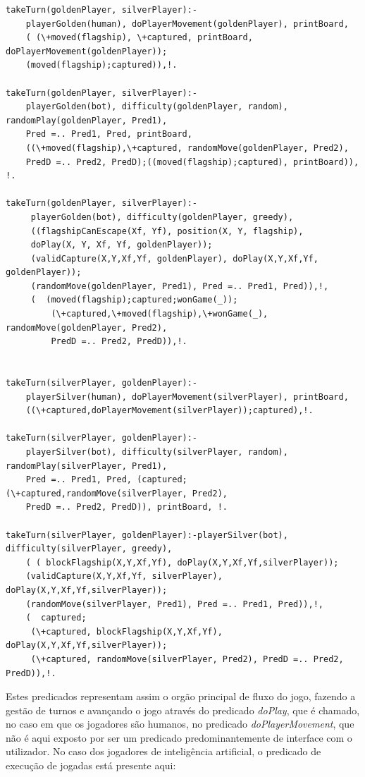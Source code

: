 \documentclass[a4paper]{article}
\begin{document}
\begin{verbatim}
takeTurn(goldenPlayer, silverPlayer):-
    playerGolden(human), doPlayerMovement(goldenPlayer), printBoard,
    ( (\+moved(flagship), \+captured, printBoard, doPlayerMovement(goldenPlayer));
    (moved(flagship);captured)),!.

takeTurn(goldenPlayer, silverPlayer):-
    playerGolden(bot), difficulty(goldenPlayer, random), randomPlay(goldenPlayer, Pred1),
    Pred =.. Pred1, Pred, printBoard,
    ((\+moved(flagship),\+captured, randomMove(goldenPlayer, Pred2),
    PredD =.. Pred2, PredD);((moved(flagship);captured), printBoard)), !.

takeTurn(goldenPlayer, silverPlayer):-
	 playerGolden(bot), difficulty(goldenPlayer, greedy),
	 ((flagshipCanEscape(Xf, Yf), position(X, Y, flagship),
	 doPlay(X, Y, Xf, Yf, goldenPlayer));
	 (validCapture(X,Y,Xf,Yf, goldenPlayer), doPlay(X,Y,Xf,Yf, goldenPlayer));
	 (randomMove(goldenPlayer, Pred1), Pred =.. Pred1, Pred)),!,
	 (  (moved(flagship);captured;wonGame(_));
	 	 (\+captured,\+moved(flagship),\+wonGame(_), randomMove(goldenPlayer, Pred2),
	 	 PredD =.. Pred2, PredD)),!.


takeTurn(silverPlayer, goldenPlayer):-
    playerSilver(human), doPlayerMovement(silverPlayer), printBoard,
    ((\+captured,doPlayerMovement(silverPlayer));captured),!.

takeTurn(silverPlayer, goldenPlayer):-
    playerSilver(bot), difficulty(silverPlayer, random), randomPlay(silverPlayer, Pred1),
    Pred =.. Pred1, Pred, (captured;(\+captured,randomMove(silverPlayer, Pred2),
    PredD =.. Pred2, PredD)), printBoard, !.

takeTurn(silverPlayer, goldenPlayer):-playerSilver(bot), difficulty(silverPlayer, greedy),
    ( ( blockFlagship(X,Y,Xf,Yf), doPlay(X,Y,Xf,Yf,silverPlayer));
	(validCapture(X,Y,Xf,Yf, silverPlayer), doPlay(X,Y,Xf,Yf,silverPlayer));
	(randomMove(silverPlayer, Pred1), Pred =.. Pred1, Pred)),!,
    (  captured;
	 (\+captured, blockFlagship(X,Y,Xf,Yf), doPlay(X,Y,Xf,Yf,silverPlayer));
	 (\+captured, randomMove(silverPlayer, Pred2), PredD =.. Pred2, PredD)),!.
\end{verbatim}

Estes predicados representam assim o orgão principal de fluxo do jogo, fazendo a gestão de turnos e avançando o jogo através do predicado \textit{doPlay}, que é chamado, no caso em que os jogadores são humanos, no predicado \textit{doPlayerMovement}, que não é aqui exposto por ser um predicado predominantemente de interface com o utilizador. No caso dos jogadores de inteligência artificial, o predicado de execução de jogadas está presente aqui:\\
\end{document}
